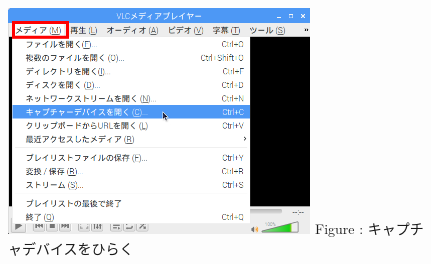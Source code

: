 \documentclass[a4paper,12pt]{jarticle}
\begin{document}
\begin{figure}[ht]
  \centering
  \begin{minipage}{8.096cm}
    {\upshape
      \includegraphics[width=8.0cm]{textbook-img116.png}
      \newline
      Figure {\theFigure\label{seq:refFigure22}}:
      キャプチャデバイスをひらく}
  \end{minipage}
\end{figure}
\clearpage
\end{document}
